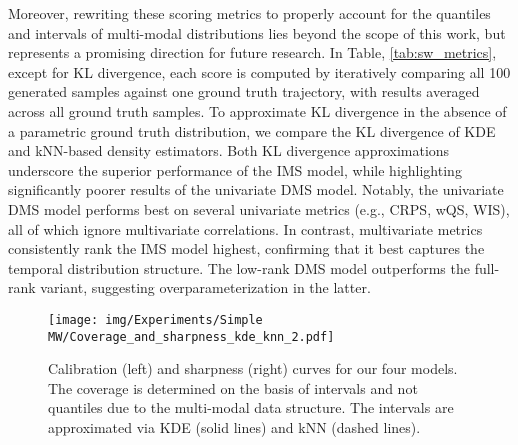 \documentclass[a4paper,oneside,bibliography=totoc]{scrbook}
\begin{document}
Moreover, rewriting these scoring metrics to properly account for the quantiles and intervals of multi-modal distributions lies beyond the scope of this work, but represents a promising direction for future research.
In Table, \ref{tab:sw_metrics}, except for KL divergence, each score is computed by iteratively comparing all 100 generated samples against one ground truth trajectory, with results averaged across all ground truth samples.
To approximate KL divergence in the absence of a parametric ground truth distribution, we compare the KL divergence of KDE and kNN-based density estimators. %
Both KL divergence approximations underscore the superior performance of the IMS model, while highlighting significantly poorer results of the univariate DMS model.
Notably, the univariate DMS model performs best on several univariate metrics (e.g., CRPS, wQS, WIS), all of which ignore multivariate correlations. In contrast, multivariate metrics consistently rank the IMS model highest, confirming that it best captures the temporal distribution structure. The low-rank DMS model outperforms the full-rank variant, suggesting overparameterization in the latter.
\begin{figure}
\centering
\texttt{[image: img/Experiments/Simple MW/Coverage\_and\_sharpness\_kde\_knn\_2.pdf]}
\caption{Calibration (left) and sharpness (right) curves for our four models. The coverage is determined on the basis of intervals and not quantiles due to the multi-modal data structure. The intervals are approximated via KDE (solid lines) and kNN (dashed lines).}
\label{fig:sw_cov_sha}
\end{figure}
\end{document}
